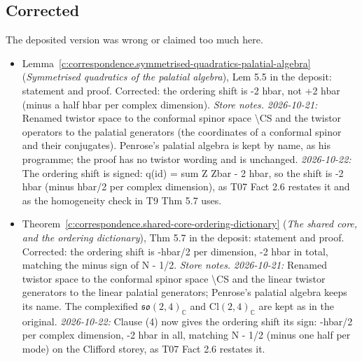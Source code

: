 \documentclass[11pt]{article}
\theoremstyle{definition}
\theoremstyle{plain}
\providecommand{\C}{}\renewcommand{\C}{\mathbb{C}}
\providecommand{\Cl}{}\renewcommand{\Cl}{\mathrm{Cl}}
\begin{document}
\subsection*{Corrected}
The deposited version was wrong or claimed too much here.
\begin{itemize}\setlength{\itemsep}{2pt}
\item Lemma~\ref{c:correspondence.symmetrised-quadratics-palatial-algebra} (\emph{Symmetrised quadratics of the palatial algebra}), Lem 5.5 in the deposit: statement and proof. Corrected: the ordering shift is -2 hbar, not +2 hbar (minus a half hbar per complex dimension). \emph{Store notes.} \emph{2026-10-21:} Renamed twistor space to the conformal spinor space \textbackslash{}CS and the twistor operators to the palatial generators (the coordinates of a conformal spinor and their conjugates). Penrose's palatial algebra is kept by name, as his programme; the proof has no twistor wording and is unchanged. \emph{2026-10-22:} The ordering shift is signed: q(id) = sum Z Zbar - 2 hbar, so the shift is -2 hbar (minus hbar/2 per complex dimension), as T07 Fact 2.6 restates it and as the homogeneity check in T9 Thm 5.7 uses.
\item Theorem~\ref{c:correspondence.shared-core-ordering-dictionary} (\emph{The shared core, and the ordering dictionary}), Thm 5.7 in the deposit: statement and proof. Corrected: the ordering shift is -hbar/2 per dimension, -2 hbar in total, matching the minus sign of N - 1/2. \emph{Store notes.} \emph{2026-10-21:} Renamed twistor space to the conformal spinor space \textbackslash{}CS and the linear twistor generators to the linear palatial generators; Penrose's palatial algebra keeps its name. The complexified $\mathfrak{so}(2,4)_\C$ and $\Cl(2,4)_\C$ are kept as in the original. \emph{2026-10-22:} Clause (4) now gives the ordering shift its sign: -hbar/2 per complex dimension, -2 hbar in all, matching N - 1/2 (minus one half per mode) on the Clifford storey, as T07 Fact 2.6 restates it.
\end{itemize}
\end{document}
